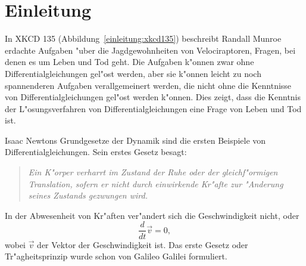 %
%
%
\chapter{Einleitung\label{chapter:einleitung}}
\rhead{}
In XKCD 135 (Abbildung~\ref{einleitung:xkcd135})
beschreibt Randall Munroe erdachte Aufgaben "uber die
Jagdgewohnheiten von Velociraptoren, Fragen, bei denen es um Leben
und Tod geht.
Die Aufgaben k"onnen zwar ohne Differentialgleichungen gel"ost
werden, aber sie k"onnen leicht zu noch spannenderen Aufgaben
verallgemeinert werden, die nicht ohne die Kenntnisse von 
Differentialgleichungen gel"ost werden k"onnen.
Dies zeigt, dass die Kenntnis der L"osungsverfahren von Differentialgleichungen
eine Frage von Leben und Tod ist.

Isaac Newtons Grundgesetze der Dynamik sind die ersten Beispiele
von Differentialgleichungen.
Sein erstes Gesetz besagt:
\begin{quote}
\em
Ein K"orper verharrt im Zustand der Ruhe oder der gleichf"ormigen Translation,
sofern er nicht durch einwirkende Kr"afte zur "Anderung seines Zustands
gezwungen wird.
\end{quote}
In der Abwesenheit von Kr"aften ver"andert sich die Geschwindigkeit nicht,
oder 
\[
\frac{d}{dt}\vec{v}=0,
\]
wobei $\vec{v}$ der Vektor der Geschwindigkeit ist.
Das erste Gesetz oder Tr"agheitsprinzip wurde schon von Galileo Galilei
formuliert.

